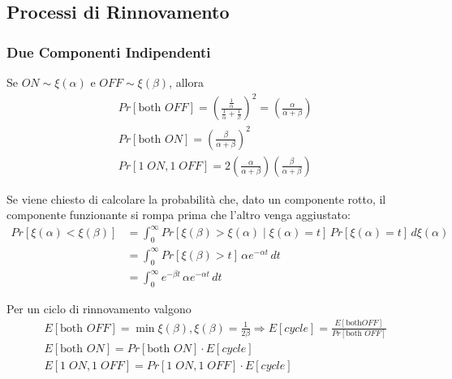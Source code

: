 \documentclass{article}
\begin{document}
\subsection{Processi di Rinnovamento}

\subsubsection{Due Componenti Indipendenti}
Se $ON \sim \xi(\alpha)$ e $OFF \sim \xi(\beta)$, allora
\begin{align*}
&Pr[\text{both } OFF] = \left(\frac{\frac{1}{\alpha}}{\frac{1}{\alpha} + \frac{1}{\beta}}\right)^2 = \left(\frac{\alpha}{\alpha + \beta} \right)\\
&Pr[\text{both } ON] = \left(\frac{\beta}{\alpha + \beta}\right)^2\\
&Pr[1\;ON,1\;OFF] = 2\left(\frac{\alpha}{\alpha + \beta}\right)\left(\frac{\beta}{\alpha + \beta}\right)
\end{align*}

Se viene chiesto di calcolare la probabilità che, dato un componente rotto, il componente funzionante si rompa prima che l'altro venga aggiustato:
\begin{align*}
Pr[\xi(\alpha) < \xi(\beta)] &= \int_0^{\infty} Pr[\xi(\beta) > \xi(\alpha)\mid \xi(\alpha) = t]\, Pr[\xi(\alpha) = t]\,d\xi(\alpha)\\
&= \int_0^{\infty} Pr[\xi(\beta) > t]\,\alpha e^{-\alpha t}\,dt\\
&= \int_0^{\infty} e^{-\beta t}\,\alpha e^{-\alpha t}\,dt
\end{align*}

Per un ciclo di rinnovamento valgono
\begin{align*}
&E[\text{both } OFF] = \min{\xi(\beta), \xi(\beta)} = \frac{1}{2\beta} \Rightarrow E[cycle] = \frac{E[\text{both} OFF]}{Pr[\text{both } OFF]}\\
&E[\text{both } ON] = Pr[\text{both } ON]\cdot E[cycle]\\
&E[1\;ON,1\;OFF] = Pr[1\;ON,1\;OFF] \cdot E[cycle]
\end{align*}
\end{document}
